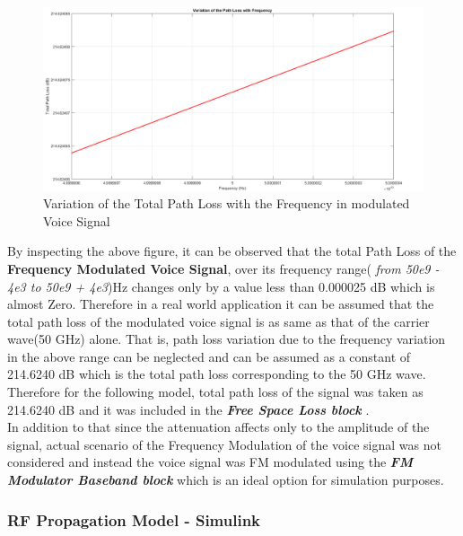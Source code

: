 \documentclass[a4paper,11pt]{article}%
\begin{document}
\begin{figure}[!h]
	\centering
	\includegraphics[scale = 0.36]{figures/voicePL}
	\caption{Variation of the Total Path Loss with the Frequency in modulated Voice Signal}
\end{figure}

By inspecting the above figure, it can be observed that the total Path Loss of the \textbf{Frequency Modulated Voice Signal}, over its frequency range( \textit{from 50e9 - 4e3 to 50e9 + 4e3})Hz changes only by a value less than 0.000025 dB which is almost Zero. Therefore in a real world application it can be assumed that the total path loss of the modulated voice signal is as same as that of the carrier wave(50 GHz) alone. That is, path loss variation due to the frequency variation in the above range can be neglected and can be assumed as a constant of 214.6240 dB which is the total path loss corresponding to the 50 GHz wave. Therefore for the following model, total path loss of the signal was taken as 214.6240 dB and it was included in the \textbf{\textit{Free Space Loss block}} .\\

In addition to that since the attenuation affects only to the amplitude of the signal, actual scenario of the Frequency Modulation of the voice signal was not considered and instead the voice signal was FM modulated using the \textbf{\textit{FM Modulator Baseband block}} which is an ideal option for simulation purposes.
\vspace{2cm}
\subsubsection{RF Propagation Model - Simulink}
\end{document}
